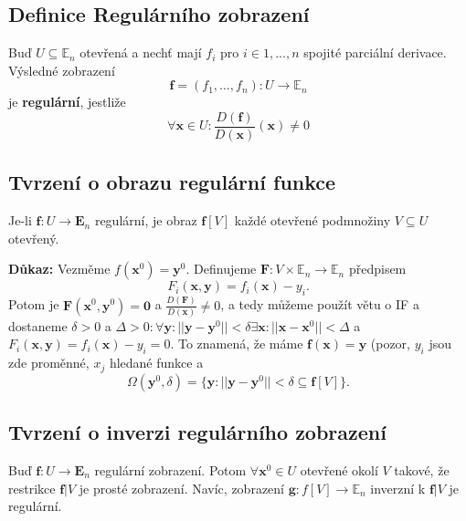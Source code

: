 \documentclass[../main.tex]{subfiles}
\begin{document}
\subsection{Definice Regulárního zobrazení}
\hspace{1.2mm}
\noindent
Buď $U \subseteq \mathbb{E}_n$ otevřená a nechť mají $f_i$ pro $i \in {1, ... , n}$
spojité parciální derivace. Výsledné zobrazení
\[ \mathbf{f} = (f_1, ... , f_n): U \to \mathbb{E}_n \]
je \textbf{regulární}, jestliže
\[ \forall \mathbf{x} \in U: \frac{D(\mathbf{f})}{D(\mathbf{x})}(\mathbf{x}) \neq 0 \]


\subsection{Tvrzení o obrazu regulární funkce}
\hspace{1.2mm}
\noindent
Je-li $\mathbf{f}: U \to \mathbf{E}_n$ regulární, je obraz $\mathbf{f}[V]$ každé otevřené podmnožiny
$V \subseteq U$ otevřený.

\vspace{5mm}
\noindent
\textbf{Důkaz:} Vezměme $f(\textbf{x}^0) = \textbf{y}^0.$ Definujeme $\textbf{F} : V \times \mathbb{E}_n \rightarrow \mathbb{E}_n$ předpisem
\[F_i(\textbf{x},\textbf{y}) = f_i(\textbf{x}) - y_i.\]
Potom je $\textbf{F}(\textbf{x}^0,\textbf{y}^0) = \textbf{0}$
a $\frac{D(\textbf{F})}{D(\textbf{x})} \neq 0$, 
a tedy můžeme použít větu o IF a dostaneme 
$\delta > 0$ a $\Delta > 0 : \forall \textbf{y} : ||\textbf{y} - \textbf{y}^0|| < \delta \exists \textbf{x} : ||\textbf{x} - \textbf{x}^0|| < \Delta$ a 
$F_i(\textbf{x},\textbf{y}) = f_i(\textbf{x}) - y_i = 0$. To znamená, že máme $\textbf{f}(\textbf{x}) = \textbf{y}$ (pozor, $y_i$ jsou zde proměnné, $x_j$ hledané funkce a
\[\Omega(\textbf{y}^0,\delta) = \{\textbf{y} : ||\textbf{y} - \textbf{y}^0 || < \delta \subseteq \textbf{f}[V]\}.\]

\subsection{Tvrzení o inverzi regulárního zobrazení}
\hspace{1.2mm}
\noindent
Buď $\mathbf{f}: U \to \mathbf{E}_n$ regulární zobrazení. Potom $\forall \mathbf{x}^0 \in U$
otevřené okolí $V$ takové, že restrikce $\mathbf{f}|V$ je prosté zobrazení. Navíc, zobrazení
$\mathbf{g}: f[V] \to \mathbb{E}_n$ inverzní k $\mathbf{f}|V$ je regulární.
\end{document}
